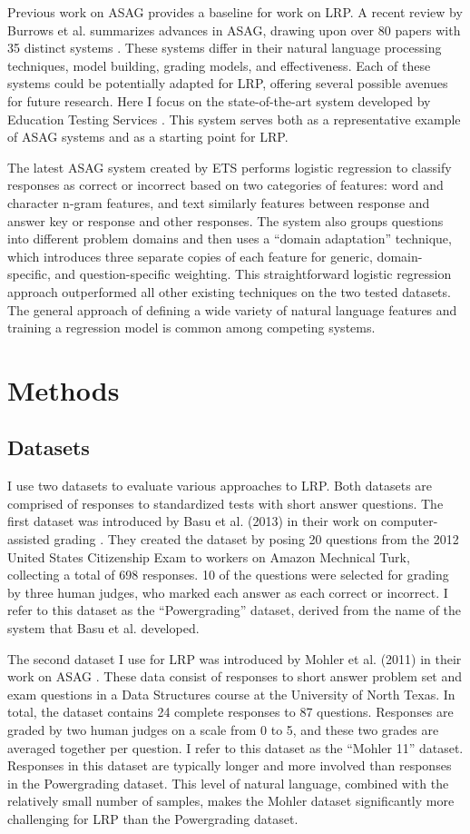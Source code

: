 Previous work on ASAG provides a baseline for work on LRP. A recent review by Burrows et al. summarizes advances in ASAG, drawing upon over 80 papers with 35 distinct systems \cite{burrows15}. These systems differ in their natural language processing techniques, model building, grading models, and effectiveness. Each of these systems could be potentially adapted for LRP, offering several possible avenues for future research. Here I focus on the state-of-the-art system developed by Education Testing Services \cite{heilman13}. This system serves both as a representative example of ASAG systems and as a starting point for LRP.

The latest ASAG system created by ETS performs logistic regression to classify responses as correct or incorrect based on two categories of features: word and character n-gram features, and text similarly features between response and answer key or response and other responses. The system also groups questions into different problem domains and then uses a ``domain adaptation'' technique, which introduces three separate copies of each feature for generic, domain-specific, and question-specific weighting. This straightforward logistic regression approach outperformed all other existing techniques on the two tested datasets. The general approach of defining a wide variety of natural language features and training a regression model is common among competing systems.

\section{Methods}
\subsection{Datasets}
I use two datasets to evaluate various approaches to LRP. Both datasets are comprised of responses to standardized tests with short answer questions. The first dataset was introduced by Basu et al. (2013) in their work on computer-assisted grading \cite{basu13}. They created the dataset by posing 20 questions from the 2012 United States Citizenship Exam to workers on Amazon Mechnical Turk, collecting a total of 698 responses. 10 of the questions were selected for grading by three human judges, who marked each answer as each correct or incorrect. I refer to this dataset as the ``Powergrading'' dataset, derived from the name of the system that Basu et al. developed.

The second dataset I use for LRP was introduced by Mohler et al. (2011) in their work on ASAG \cite{mohler11}. These data consist of responses to short answer problem set and exam questions in a Data Structures course at the University of North Texas. In total, the dataset contains 24 complete responses to 87 questions. Responses are graded by two human judges on a scale from 0 to 5, and these two grades are averaged together per question. I refer to this dataset as the ``Mohler 11'' dataset. Responses in this dataset are typically longer and more involved than responses in the Powergrading dataset. This level of natural language, combined with the relatively small number of samples, makes the Mohler dataset significantly more challenging for LRP than the Powergrading dataset.

